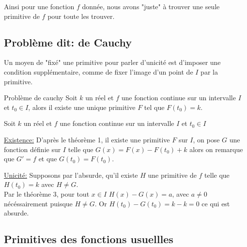 \documentclass[french]{book}
\begin{document}
Ainsi pour une fonction $f$ donnée, nous avons "juste" à trouver une seule primitive de $f$ pour toute les trouver.

\subsection{Problème dit: de Cauchy}
Un moyen de "fixé" une primitive pour parler d'unicité est d'imposer une condition supplémentaire, comme de fixer l'image d'un point de $I$ par la primitive.

\begin{thm}{Problème de cauchy}
Soit $k$ un réel et $f$ une fonction continue sur un intervalle $I$ et $t_0\in I$, alors il existe une unique primitive $F$ tel que $F(t_0)=k$.
\end{thm}


\begin{demo}
Soit $k$ un réel et $f$ une fonction continue sur un intervalle $I$ et $t_0\in I$

\underline{Existence:} 
D'après le théorème 1, il existe une primitive $F$ sur $I$, on pose $G$ une fonction définie sur $I$ telle que $G(x)=F(x)-F(t_0)+k$ alors on remarque que $G'=f$ et que $G(t_0)=F(t_0)$.

 \underline{Unicité:}
Supposons par l'absurde, qu'il existe $H$ une primitive de $f$ telle que $H(t_0)=k$ avec $H\neq G$.\\

Par le théorème 3, pour tout $x \in I$ $H(x)-G(x)=a$, avec $a \neq 0$ nécéssairement puisque $H\neq G$. Or $H(t_0)-G(t_0)=k-k=0$ ce qui est absurde. 
\end{demo}
\newpage

\subsection{Primitives des fonctions usuellles}
\end{document}
